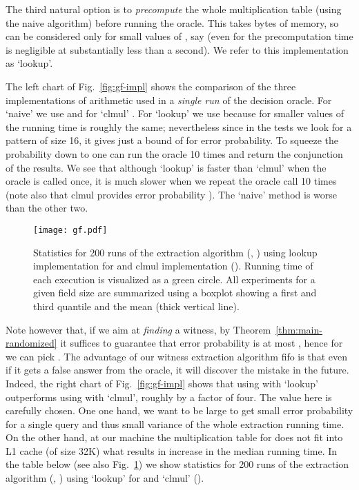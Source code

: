 \documentclass[11pt]{article}
\begin{document}
The third natural option is to {\em precompute} the whole multiplication table (using the naive algorithm) before running the oracle.
This takes  bytes of memory, so can be considered only for small values of , say  (even for  the precomputation time is negligible at substantially less than a second). We refer to this implementation as `lookup'.

The left chart of Fig.~\ref{fig:gf-impl} shows the comparison of the three implementations of  arithmetic used in a {\em single run} of the decision oracle. For `naive' we use  and for `clmul' . For `lookup' we use  because for smaller values of  the running time is roughly the same; nevertheless since in the tests we look for a pattern of size 16, it gives just a bound of  for error probability. To squeeze the probability down to  one can run the oracle 10 times and return the conjunction of the results. We see that although `lookup' is faster than `clmul' when the oracle is called once, it is much slower when we repeat the oracle call 10 times (note also that clmul provides error probability ). The `naive' method is worse than the other two. 

 \begin{figure}[!ht]
  \texttt{[image: gf.pdf]}
  \label{fig:boxplots}
  \caption{Statistics for 200 runs of the extraction algorithm (, ) using lookup implementation for  and clmul implementation (). Running time of each execution is visualized as a green circle. All experiments for a given field size  are summarized using a boxplot showing a first and third quantile and the mean (thick vertical line).}
 \end{figure}

 Note however that, if we aim at {\em finding} a witness, by Theorem~\ref{thm:main-randomized} it suffices to guarantee that error probability is at most , hence for  we can pick . The advantage of our witness extraction algorithm fifo is that even if it gets a false answer from the oracle, it will discover the mistake in the future. Indeed, the right chart of  Fig.~\ref{fig:gf-impl} shows that using  with `lookup' outperforms using  with `clmul', roughly by a factor of four. 
The value  here is carefully chosen. One one hand, we want  to be large to get small error probability for a single query and thus small variance of the whole extraction running time. On the other hand, at our machine the multiplication table for  does not fit into L1 cache (of size 32K) what results in increase in the median running time. In the table below (see also Fig.~\ref{fig:boxplots}) we show statistics for 200 runs of the extraction algorithm (, ) using `lookup' for  and `clmul' (). 
\end{document}
